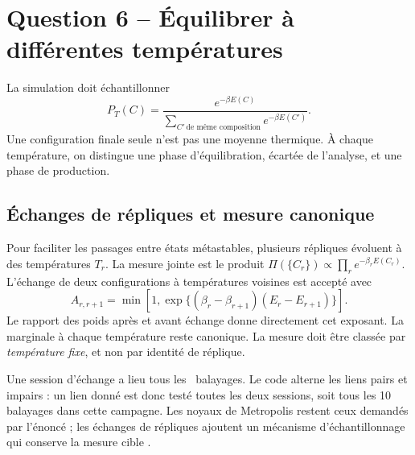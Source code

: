 \documentclass[10pt,a4paper]{article}
\begin{document}
\section{Question 6 -- Équilibrer à différentes températures}
La simulation doit échantillonner
\[
P_T(C)=\frac{e^{-\beta E(C)}}{\sum_{C'\,\text{de même composition}}e^{-\beta E(C')}}.
\]
Une configuration finale seule n'est pas une moyenne thermique. À chaque
température, on distingue une phase d'équilibration, écartée de l'analyse,
et une phase de production.

\subsection{Échanges de répliques et mesure canonique}
Pour faciliter les passages entre états métastables, plusieurs répliques
évoluent à des températures $T_r$. La mesure jointe est le produit
$\Pi(\{C_r\})\propto\prod_r e^{-\beta_rE(C_r)}$. L'échange de deux
configurations à températures voisines est accepté avec
\begin{equation}
A_{r,r+1}=\min\left[1,
\exp\{(\beta_r-\beta_{r+1})(E_r-E_{r+1})\}\right].
\end{equation}
Le rapport des poids après et avant échange donne directement cet exposant.
La marginale à chaque température reste canonique. La mesure doit être
classée par \emph{température fixe}, et non par identité de réplique.

Une session d'échange a lieu tous les \ExchangeEvery\ balayages. Le code
alterne les liens pairs et impairs : un lien donné est donc testé toutes
les deux sessions, soit tous les 10 balayages dans cette campagne. Les noyaux de
Metropolis restent ceux demandés par l'énoncé ; les échanges de répliques
ajoutent un mécanisme d'échantillonnage qui conserve la mesure cible
\cite{metropolis,hukushima}.
\end{document}
